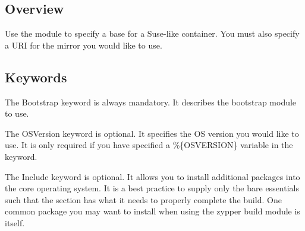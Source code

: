 \documentclass[letterpaper,10pt,english]{sphinxmanual}
\begin{document}
\subsection{Overview}
\label{\detokenize{appendix:id20}}
Use the  module to specify a base for a Suse-like container. You must also specify a URI for
the mirror you would like to use.


\subsection{Keywords}
\label{\detokenize{appendix:id21}}
%
\begin{sphinxVerbatim}[commandchars=\\\{\}]
 
\end{sphinxVerbatim}

The Bootstrap keyword is always mandatory. It describes the bootstrap module to use.

%
\begin{sphinxVerbatim}[commandchars=\\\{\}]
 
\end{sphinxVerbatim}

The OSVersion keyword is optional. It specifies the OS version you would like to use.
It is only required if you have specified a \%\{OSVERSION\} variable in the  keyword.

%
\begin{sphinxVerbatim}[commandchars=\\\{\}]
 
\end{sphinxVerbatim}

The Include keyword is optional. It allows you to install additional packages into the core operating system.
It is a best practice to supply only the bare essentials such that the  section has what it needs to properly complete the build.
One common package you may want to install when using the zypper build module is  itself.
\end{document}
